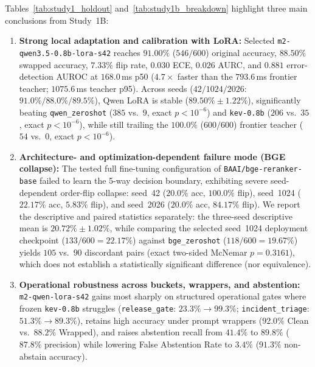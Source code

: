 \documentclass[11pt,a4paper]{article}
\begin{document}
Tables~\ref{tab:study1_holdout} and~\ref{tab:study1b_breakdown} highlight three main conclusions from Study~1B:
\begin{enumerate}[leftmargin=1.5em,itemsep=2pt]
  \item \textbf{Strong local adaptation and calibration with LoRA:} Selected \texttt{m2-qwen3.5-0.8b-lora-s42} reaches $91.00\%$ ($546/600$) original accuracy, $88.50\%$ swapped accuracy, $7.33\%$ flip rate, $0.030$ ECE, $0.026$ AURC, and $0.881$ error-detection AUROC at $168.0$\,ms p50 ($4.7\times$ faster than the $793.6$\,ms frontier teacher; $1075.6$\,ms teacher p95). Across seeds ($42/1024/2026$: $91.0\% / 88.0\% / 89.5\%$), Qwen LoRA is stable ($89.50\% \pm 1.22\%$), significantly beating \texttt{qwen\_zeroshot} ($385$ vs.\ $9$, exact $p < 10^{-6}$) and \texttt{kev-0.8b} ($206$ vs.\ $35$, exact $p < 10^{-6}$), while still trailing the $100.0\%$ ($600/600$) frontier teacher ($54$ vs.\ $0$, exact $p < 10^{-6}$).
  \item \textbf{Architecture- and optimization-dependent failure mode (BGE collapse):} The tested full fine-tuning configuration of \texttt{BAAI/bge-reranker-base} failed to learn the 5-way decision boundary, exhibiting severe seed-dependent order-flip collapse: seed~42 ($20.0\%$ acc, $100.0\%$ flip), seed~1024 ($22.17\%$ acc, $5.83\%$ flip), and seed~2026 ($20.0\%$ acc, $84.17\%$ flip). We report the descriptive and paired statistics separately: the three-seed descriptive mean is $20.72\% \pm 1.02\%$, while comparing the selected seed~1024 deployment checkpoint ($133/600 = 22.17\%$) against \texttt{bge\_zeroshot} ($118/600 = 19.67\%$) yields $105$ vs.\ $90$ discordant pairs (exact two-sided McNemar $p = 0.3161$), which does not establish a statistically significant difference (nor equivalence).
  \item \textbf{Operational robustness across buckets, wrappers, and abstention:} \texttt{m2-qwen-lora-s42} gains most sharply on structured operational gates where frozen \texttt{kev-0.8b} struggles (\texttt{release\_gate}: $23.3\% \rightarrow 99.3\%$; \texttt{incident\_triage}: $51.3\% \rightarrow 89.3\%$), retains high accuracy under prompt wrappers ($92.0\%$ Clean vs.\ $88.2\%$ Wrapped), and raises abstention recall from $41.4\%$ to $89.8\%$ ($87.8\%$ precision) while lowering False Abstention Rate to $3.4\%$ ($91.3\%$ non-abstain accuracy).
\end{enumerate}
\end{document}

